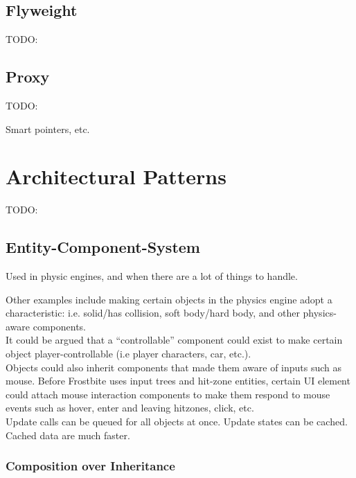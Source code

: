 \documentclass[10pt,letterpaper]{article}
\newcommand{\bs}{\bigskip}
\begin{document}
\begin{multicols}{2}
\subsection{Flyweight}
TODO:

\subsection{Proxy}
TODO:

Smart pointers, etc.

\section{Architectural Patterns}

TODO:

\subsection{Entity-Component-System}\label{ssection:ecs}

Used in physic engines, and when there are a lot of things to handle.


Other examples include making certain objects in the physics engine adopt a characteristic: i.e. solid/has collision, soft body/hard body, and other physics-aware components.\bs
\\
It could be argued that a ``controllable'' component could exist to make certain object player-controllable (i.e player characters, car, etc.).\bs
\\
Objects could also inherit components that made them aware of inputs such as mouse. Before Frostbite uses input trees and hit-zone entities, certain UI element could attach mouse interaction components to make them respond to mouse events such as hover, enter and leaving hitzones, click, etc.\bs
\\

Update calls can be queued for all objects at once. Update states can be cached. Cached data are much faster.

\subsubsection{Composition over Inheritance}


\end{multicols}
\end{document}
